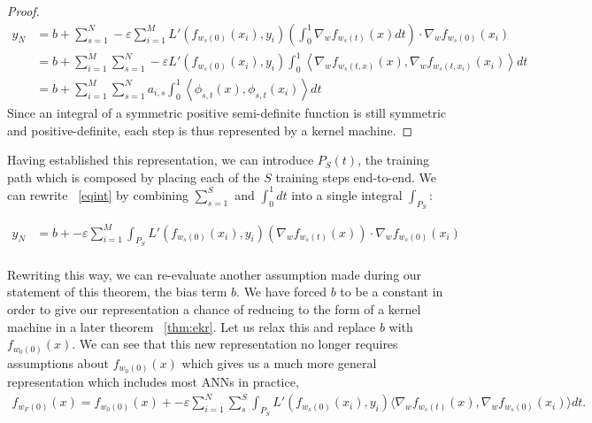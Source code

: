 \begin{proof}
\begin{align*}
y_N &= b + \sum_{s = 1}^N -\varepsilon \sum_{i = 1}^{M} L'(f_{w_s(0)}(x_i),  y_i)
      \left(\int_0^1\nabla_w f_{w_s(t)}(x)dt\right) \cdot \nabla_w
      f_{w_s(0)}(x_i)\\   \label{eqint}
&= b + \sum_{i = 1}^{M}\sum_{s = 1}^N -\varepsilon  L'(f_{w_s(0)}(x_i),  y_i)  \int_0^1\left\langle \nabla_w f_{w_s(t,x)}(x), \nabla_w f_{w_s(t,x_i)}(x_i) \right\rangle dt\\ 
&= b + \sum_{i = 1}^{M}\sum_{s = 1}^N a_{i, s}  \int_0^1 \left\langle \phi_{s,t}(x), \phi_{s,t}(x_i)\right\rangle dt
\end{align*}
Since an integral of a symmetric positive semi-definite function is still symmetric and positive-definite, each step is thus represented by a kernel machine. 

\end{proof}

Having established this representation, we can introduce $P_S(t)$, the
training path which is composed by placing each of the $S$ training
steps end-to-end. We can rewrite ~\ref{eqint} by combining $\sum_{s =
  1}^S$ and $\int_0^1 dt$ into a single integral $\int_{P_S}$:

\begin{align}
y_N &= b +  -\varepsilon \sum_{i = 1}^{M} \int_{P_S} 
      L'(f_{w_s(0)}(x_i),  y_i)
      \left(\nabla_w f_{w_s(t)}(x)\right) \cdot \nabla_w
      f_{w_s(0)}(x_i)\\   \label{eqint}
\end{align}

Rewriting this way, we can re-evaluate another assumption made during
our statement of this theorem, the bias term $b$. We have forced $b$
to be a constant in order to give our representation a chance of
reducing to the form of a kernel machine in a later theorem
~\ref{thm:ekr}. Let us relax this and replace $b$ with
$f_{w_0(0)}(x)$. We can see that this new representation no longer
requires assumptions about $f_{w_0(0)}(x)$ which gives us a much more
general representation which includes most ANNs in practice, 
\begin{align}
f_{w_F(0)}(x) = f_{w_0(0)}(x) +  -\varepsilon \sum_{i=1}^N \sum_s^S \int_{P_S} L'(f_{w_s(0)}(x_i),  y_i)
      \langle\nabla_w f_{w_s(t)}(x), \nabla_w
      f_{w_s(0)}(x_i)\rangle dt \label{eqint}.
\end{align}

